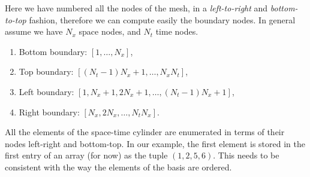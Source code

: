 \documentclass[]{report}
\begin{document}
    Here we have numbered all the nodes of the mesh, in a \textit{left-to-right} and \textit{bottom-to-top} fashion, therefore we can compute easily the boundary nodes. In general assume we have $N_x$ space nodes, and $N_t$ time nodes.
    \begin{enumerate}
        \item Bottom boundary: $[1,\dots,N_x]$,
        \item Top boundary: $[(N_t - 1)N_x + 1, \dots, N_x N_t]$,
        \item Left boundary: $[1, N_x + 1, 2N_x + 1, \dots, (N_t - 1) N_x + 1]$,
        \item Right boundary: $[N_x, 2N_x, \dots, N_t N_x]$.
    \end{enumerate}
    All the elements of the space-time cylinder are enumerated in terms of their nodes left-right and bottom-top. In our example, the first element is stored in the first entry of an array (for now) as the tuple $(1,2,5,6)$. This needs to be consistent with the way the elements of the basis are ordered.
\end{document}
